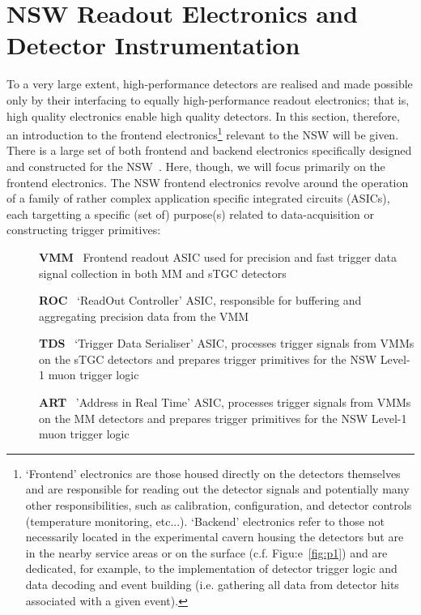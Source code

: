 \section{NSW Readout Electronics and Detector Instrumentation}
\label{sec:nsw_elx}

To a very large extent, high-performance detectors are realised and made
possible only by their interfacing to equally high-performance readout electronics;
that is, high quality electronics enable high quality detectors.
{\color{red}{See Appendix XXX for a discussion on the general characteristics of
detector readout electronics.}}
In this section, therefore, an introduction to the frontend electronics\footnote{`Frontend' electronics
are those housed directly on the detectors themselves and are responsible for reading out the
detector signals and potentially many other responsibilities, such as calibration, configuration, and
detector controls (temperature monitoring, etc...). `Backend' electronics refer to those
not necessarily located in the experimental cavern housing the detectors but are in the nearby
service areas or on the surface (c.f. Figu:e~\ref{fig:p1}) and are dedicated, for example, to the implementation of detector trigger logic
and data decoding and event building (i.e. gathering all data from detector hits associated with a given event).}
relevant to the NSW will be given.
There is a large set of both frontend and backend electronics specifically
designed and constructed for the NSW~\cite{NSWFrontEndChristos}.
Here, though, we will focus primarily on the frontend electronics.
The NSW frontend electronics revolve around the operation of a family
of rather complex application specific integrated circuits (ASICs),
each targetting a specific (set of) purpose(s) related to data-acquisition or
constructing trigger primitives:

\begin{description}
    \item[] \textbf{VMM}~\cite{VMM1GDG,VMMASIC,VMM3George} Frontend readout ASIC used for precision and fast trigger data signal collection in both MM and sTGC detectors
    \item[] \textbf{ROC}~\cite{NSWTDR,NSWFrontEndChristos} `ReadOut Controller' ASIC, responsible for buffering and aggregating precision data from the VMM
    \item[] \textbf{TDS}~\cite{TDS} `Trigger Data Serialiser' ASIC, processes trigger signals from VMMs on the sTGC detectors and prepares trigger primitives for the NSW Level-1 muon trigger logic
    \item[] \textbf{ART}~\cite{NSWTDR,ARTASIC} 'Address in Real Time' ASIC, processes trigger signals from VMMs on the MM detectors and prepares trigger primitives for the NSW Level-1 muon trigger logic
\end{description}

